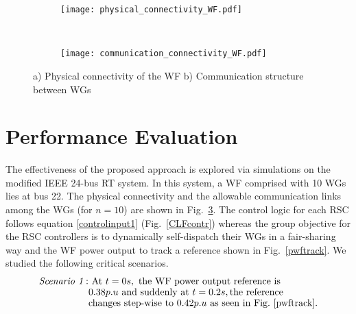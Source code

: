 \documentclass[letterpaper, 10 pt, conference]{ieeeconf}
\begin{document}
\begin{figure}
       \begin{subfigure}{0.34\textwidth}
   \texttt{[image: physical\_connectivity\_WF.pdf]}
        \caption{}
        \label{physicalcon}
    \end{subfigure}\\
    \begin{subfigure}{0.32\textwidth}    
   \texttt{[image: communication\_connectivity\_WF.pdf]}
        \caption{} 
        \label{commcon}
    \end{subfigure}
         \caption{a) Physical connectivity of the WF b) Communication structure between WGs }
        \label{physcomtop}
\end{figure}

\section{Performance Evaluation}
The effectiveness of the proposed approach is explored via simulations on the modified IEEE 24-bus RT system. In this system, a WF comprised with 10 WGs lies at bus 22.  The physical connectivity and the allowable communication links among the WGs (for $n=10$) are shown in Fig.~\ref{physcomtop}. The control logic for each RSC follows equation \eqref{controlinput1} (Fig.~\ref{CLFcontr}) whereas the group objective for the RSC controllers is to dynamically self-dispatch their WGs in a fair-sharing way and the WF power output to track a reference shown in Fig.~\ref{pwftrack}.  We studied the following critical scenarios.
\begin{align}
\textit{Scenario 1}:& \text{ At } t=0s, \text{ the WF power output reference is} \nonumber
\\[-0.05in]& \text{$0.38 p.u$  and suddenly at } t=0.2s, \text{the reference }\nonumber\\[-0.05in]& \text{changes step-wise to $0.42 p.u$ as seen in Fig.~\ref{pwftrack}}.\nonumber
\end{align}
\end{document}
